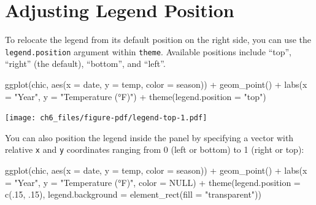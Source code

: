 \documentclass[
  letterpaper,
]{scrbook}
\newenvironment{Shaded}{\begin{snugshade}}{\end{snugshade}}
\newcommand{\AttributeTok}[1]{\textcolor[rgb]{0.40,0.45,0.13}{#1}}
\newcommand{\ConstantTok}[1]{\textcolor[rgb]{0.56,0.35,0.01}{#1}}
\newcommand{\DecValTok}[1]{\textcolor[rgb]{0.68,0.00,0.00}{#1}}
\newcommand{\FunctionTok}[1]{\textcolor[rgb]{0.28,0.35,0.67}{#1}}
\newcommand{\NormalTok}[1]{\textcolor[rgb]{0.00,0.23,0.31}{#1}}
\newcommand{\SpecialCharTok}[1]{\textcolor[rgb]{0.37,0.37,0.37}{#1}}
\newcommand{\StringTok}[1]{\textcolor[rgb]{0.13,0.47,0.30}{#1}}
\begin{document}
\section{Adjusting Legend Position}\label{adjusting-legend-position}

To relocate the legend from its default position on the right side, you
can use the \texttt{legend.position} argument within \texttt{theme}.
Available positions include ``top'', ``right'' (the default),
``bottom'', and ``left''.

\begin{Shaded}
\begin{Highlighting}[]
\FunctionTok{ggplot}\NormalTok{(chic, }\FunctionTok{aes}\NormalTok{(}\AttributeTok{x =}\NormalTok{ date, }\AttributeTok{y =}\NormalTok{ temp, }\AttributeTok{color =}\NormalTok{ season)) }\SpecialCharTok{+}
  \FunctionTok{geom\_point}\NormalTok{() }\SpecialCharTok{+}
  \FunctionTok{labs}\NormalTok{(}\AttributeTok{x =} \StringTok{"Year"}\NormalTok{, }\AttributeTok{y =} \StringTok{"Temperature (°F)"}\NormalTok{) }\SpecialCharTok{+}
  \FunctionTok{theme}\NormalTok{(}\AttributeTok{legend.position =} \StringTok{"top"}\NormalTok{)}
\end{Highlighting}
\end{Shaded}

\texttt{[image: ch6\_files/figure-pdf/legend-top-1.pdf]}

You can also position the legend inside the panel by specifying a vector
with relative \texttt{x} and \texttt{y} coordinates ranging from 0 (left
or bottom) to 1 (right or top):

\begin{Shaded}
\begin{Highlighting}[]
\FunctionTok{ggplot}\NormalTok{(chic, }\FunctionTok{aes}\NormalTok{(}\AttributeTok{x =}\NormalTok{ date, }\AttributeTok{y =}\NormalTok{ temp, }\AttributeTok{color =}\NormalTok{ season)) }\SpecialCharTok{+}
  \FunctionTok{geom\_point}\NormalTok{() }\SpecialCharTok{+}
  \FunctionTok{labs}\NormalTok{(}\AttributeTok{x =} \StringTok{"Year"}\NormalTok{, }\AttributeTok{y =} \StringTok{"Temperature (°F)"}\NormalTok{,}
       \AttributeTok{color =} \ConstantTok{NULL}\NormalTok{) }\SpecialCharTok{+}
  \FunctionTok{theme}\NormalTok{(}\AttributeTok{legend.position =} \FunctionTok{c}\NormalTok{(.}\DecValTok{15}\NormalTok{, .}\DecValTok{15}\NormalTok{),}
        \AttributeTok{legend.background =} \FunctionTok{element\_rect}\NormalTok{(}\AttributeTok{fill =} \StringTok{"transparent"}\NormalTok{))}
\end{Highlighting}
\end{Shaded}
\end{document}
